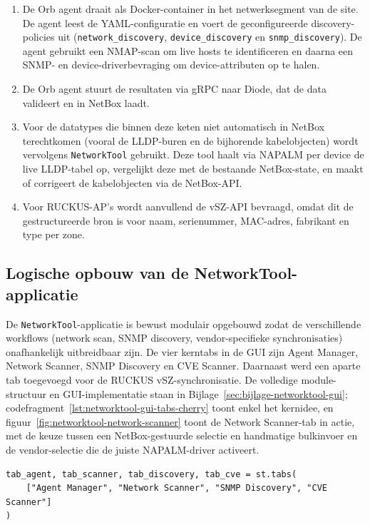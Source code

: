 \begin{enumerate}
  \item De Orb agent draait als Docker-container in het netwerksegment van de site. De agent leest de YAML-configuratie en voert de geconfigureerde discovery-policies uit (\texttt{network\_discovery}, \texttt{device\_discovery} en \texttt{snmp\_discovery}). De agent gebruikt een NMAP-scan om live hosts te identificeren en daarna een SNMP- en device-driverbevraging om device-attributen op te halen\autocite{NetBoxDiscoveryDocs,NetBoxLabsOrbAgent}.
  \item De Orb agent stuurt de resultaten via gRPC naar Diode, dat de data valideert en in NetBox laadt\autocite{DiodeDocs}.
  \item Voor de datatypes die binnen deze keten niet automatisch in NetBox terechtkomen (vooral de LLDP-buren en de bijhorende kabelobjecten) wordt vervolgens \texttt{NetworkTool} gebruikt. Deze tool haalt via NAPALM\autocite{NAPALM} per device de live LLDP-tabel op, vergelijkt deze met de bestaande NetBox-state, en maakt of corrigeert de kabelobjecten via de NetBox-API.
  \item Voor RUCKUS-AP's wordt aanvullend de vSZ-API\autocite{RuckusVSZ} bevraagd, omdat dit de gestructureerde bron is voor naam, serienummer, MAC-adres, fabrikant en type per zone.
\end{enumerate}

\subsection{Logische opbouw van de NetworkTool-applicatie}

De \texttt{NetworkTool}-applicatie is bewust modulair opgebouwd zodat de verschillende workflows (network scan, SNMP discovery, vendor-specifieke synchronisaties) onafhankelijk uitbreidbaar zijn. De vier kerntabs in de GUI zijn Agent Manager, Network Scanner, SNMP Discovery en CVE Scanner. Daarnaast werd een aparte tab toegevoegd voor de RUCKUS vSZ-synchronisatie. De volledige module-structuur en GUI-implementatie staan in Bijlage~\ref{sec:bijlage-networktool-gui}; codefragment~\ref{lst:networktool-gui-tabs-cherry} toont enkel het kernidee, en figuur~\ref{fig:networktool-network-scanner} toont de Network Scanner-tab in actie, met de keuze tussen een NetBox-gestuurde selectie en handmatige bulkinvoer en de vendor-selectie die de juiste NAPALM-driver activeert.

\begin{listing}[H]
  \caption{NetworkTool: tab-architectuur}
  \label{lst:networktool-gui-tabs-cherry}
  \begin{verbatim}
tab_agent, tab_scanner, tab_discovery, tab_cve = st.tabs(
    ["Agent Manager", "Network Scanner", "SNMP Discovery", "CVE Scanner"]
)
  \end{verbatim}
\end{listing}

